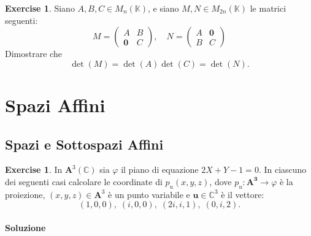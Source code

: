 \documentclass{article}
\theoremstyle{plain}
\theoremstyle{definition}
\newtheorem{xca}[exmp]{Exercise}
\theoremstyle{remark}
\begin{document}
\begin{bxthm}
\begin{xca}
    Siano $A,B,C\in M_n(\mathbb{K})$, e siano $M,N\in M_{2n}(\mathbb{K})$ le matrici seguenti:
    \[M=\begin{pmatrix}
        A&B\\
        \mathbf{0}&C
    \end{pmatrix},\quad N=\begin{pmatrix}
        A&\mathbf{0}\\
        B&C
    \end{pmatrix}\]
    Dimostrare che 
    \[\det(M)=\det(A)\det(C)=\det(N).\]
\end{xca}
\end{bxthm}

\newpage
\section{Spazi Affini}
\vspace{20pt}

\vspace{20pt}
\subsection{Spazi e Sottospazi Affini}
\vspace{20pt}


\begin{bxthm}
\begin{xca}
    In $\mathbf{A}^3(\mathbb{C})$ sia $\varphi$ il piano di equazione $2X+Y-1=0$. 
    In ciascuno dei seguenti casi calcolare le coordinate di $p_u(x,y,z)$, dove $p_u:\mathbf{A^3}\to\varphi$ è la proiezione, $(x,y,z)\in\mathbf{A}^3$ è un punto variabile e $\mathbf{u}\in\mathbb{C}^3$ è il vettore:
    \[(1,0,0),\;(i,0,0),\;(2i,i,1),\;(0,i,2).\]
\end{xca}
\end{bxthm}
\paragraph{Soluzione}

\vspace{10pt}
\end{document}
